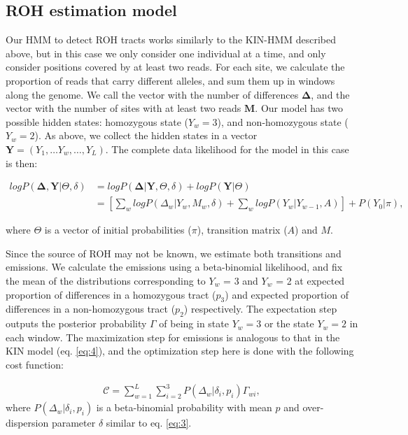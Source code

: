 \documentclass[12pt, letterpaper]{article}
\begin{document}
\subsection{ROH estimation model}\label{roh}
Our HMM to detect ROH tracts works similarly to the KIN-HMM described above, but in this case we only consider one individual at a time, and only consider positions covered by at least two reads. For each site, we calculate the proportion of reads that carry different alleles, and sum them up in windows along the genome. We call the vector with the number of differences $\mathbf{\Delta}$, and the vector with the number of sites with at least two reads $\mathbf{M}$. Our model has two possible hidden states: homozygous state ($Y_w=3$), and non-homozygous state ($Y_w=2$). As above, we collect the hidden states in a vector $\mathbf{Y} = (Y_1, \dots Y_w, \dots, Y_L)$. The complete data likelihood for the model in this case is then:

\begin{align}\label{eq:10}
    log P(\mathbf{\Delta},\mathbf{Y}|\Theta,\delta) &= log P(\mathbf{\Delta}|\mathbf{Y},\Theta, \delta) + log P(\mathbf{Y}|\Theta)\nonumber\\
 &= [\sum_{w} log P(\Delta_w|Y_w, M_w, \delta) + \sum_{w} log P(Y_w|Y_{w-1}, A)] + P(Y_0| \pi),
\end{align}

where $\Theta$ is a vector of initial probabilities ($\pi$), transition matrix ($A$) and $M$.

Since the source of ROH may not be known, we estimate both transitions and emissions. We calculate the emissions using a beta-binomial likelihood, and fix the mean of the distributions corresponding to $Y_w$ = 3 and $Y_w$ = 2 at expected proportion of differences in a homozygous tract ($p_3$) and expected proportion of differences in a non-homozygous tract ($p_2$) respectively. The expectation step outputs the posterior probability $\Gamma$ of being in state $Y_w=3$ or the state $Y_w=2$ in each window. The maximization step for emissions is analogous to that in the KIN model (eq. \ref{eq:4}), and the optimization step here is done with the following cost function:

\begin{align}\label{eq:11}
\mathcal{C} = \sum_{w=1}^L \sum_{i=2}^3 P(\Delta_w|\delta_{i},p_{i}) \Gamma_{wi} ,
\end{align}
where $P(\Delta_w|\delta_{i},p_{i})$ is a beta-binomial probability with mean $p$ and over-dispersion parameter $\delta$ similar to eq. \ref{eq:3}.
\end{document}

